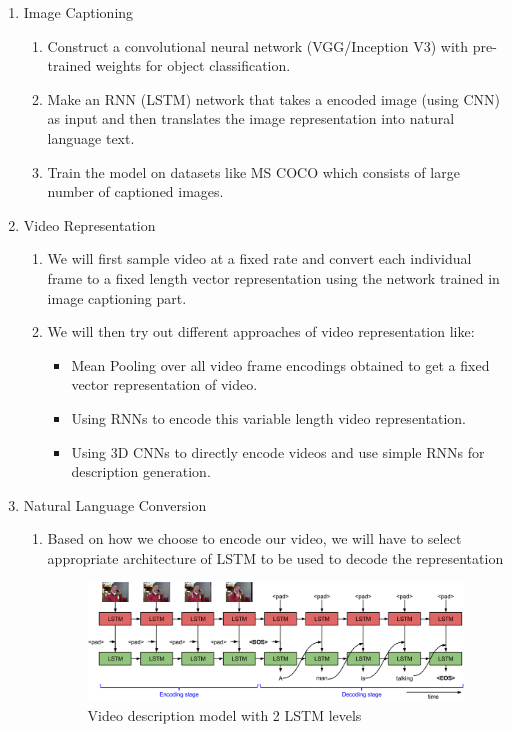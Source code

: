 \documentclass[11pt]{article}
\begin{document}
		\begin{enumerate}
			\item Image Captioning
			\begin{enumerate}
				\item
					Construct a convolutional neural network (VGG/Inception V3) with pre-trained weights for object classification.
				\item
					Make an RNN (LSTM) network\cite{showandtell} that takes a encoded image (using CNN) as input and then translates the image representation into natural language text.
				\item
					Train the model on datasets like MS COCO which consists of large number of captioned images.
			\end{enumerate}
			\item Video Representation
			\begin{enumerate}
				\item
					We will first sample video at a fixed rate and convert each individual frame to a fixed length vector representation using the network trained in image captioning part.
				\item
					We will then try out different approaches of video representation like:
					\begin{itemize}
						\item
							Mean Pooling over all video frame encodings obtained to get a fixed vector representation of video\cite{proposal}.
						\item
							Using RNNs to encode this variable length video representation\cite{s2vt}.
						\item
							Using 3D CNNs to directly encode videos and use simple RNNs for description generation\cite{temporal}.
					\end{itemize}					
			\end{enumerate}
			\item Natural Language Conversion
			\begin{enumerate}
				\item
					Based on how we choose to encode our video, we will have to select appropriate architecture of LSTM to be used to decode the representation
				\begin{figure}[ht!]
				\centering
					\includegraphics[width=10cm]{s2vt.png}
					\caption{Video description model with 2 LSTM levels\label{fig1}}
				\end{figure}


\end{enumerate}
\end{enumerate}
\end{document}
